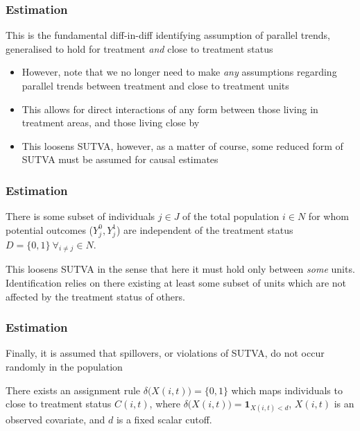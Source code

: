 \documentclass[10pt,letterpaper,subeqn]{beamer}
\begin{document}
\begin{frame}[label=estim5]
  \frametitle{Estimation}
This is the fundamental diff-in-diff identifying assumption of parallel trends, 
generalised to hold for treatment \emph{and} close to treatment status
\vspace{4mm} \\
\begin{itemize}
\item However, note that we no longer need to make \emph{any} assumptions 
regarding parallel trends between treatment and close to treatment units
\item This allows for direct interactions of any form between those living in 
treatment areas, and those living close by
\item This loosens SUTVA, however, as a matter of course, some reduced form of 
SUTVA must be assumed for causal estimates
\end{itemize}
\end{frame}


\begin{frame}[label=estim6]
  \frametitle{Estimation}
\begin{tcolorbox}[title =3. SUTVA holds for some units]
There is some subset of individuals $j\in J$ of the total population $i\in N$ 
for whom potential outcomes ($Y_j^0, Y_j^1$) are independent of the treatment 
status $D=\{0,1\}\ \forall_{i\neq j} \in N$.
\end{tcolorbox}
\vspace{4mm}
This loosens SUTVA in the sense that here it must hold only between \emph{some}
units.  Identification relies on there existing at least some subset of units 
which are not affected by the treatment status of others.
\end{frame}


\begin{frame}[label=estim7]
  \frametitle{Estimation}
Finally, it is assumed that spillovers, or violations of SUTVA, do not occur 
randomly in the population
\vspace{4mm}
\begin{tcolorbox}[title =4. Assignment to close to treatment depends on observable $X$]
There exists an assignment rule $\delta\Big(X(i,t)\Big)=\{0,1\}$ which maps 
individuals to close to treatment status $C(i,t)$, where $\delta\Big(X(i,t)\Big)=
\mathbf{1}_{X(i,t)<d}$, $X(i,t)$ is an observed covariate, and $d$ is a fixed
scalar cutoff. 
\end{tcolorbox}
\end{frame}
\end{document}
